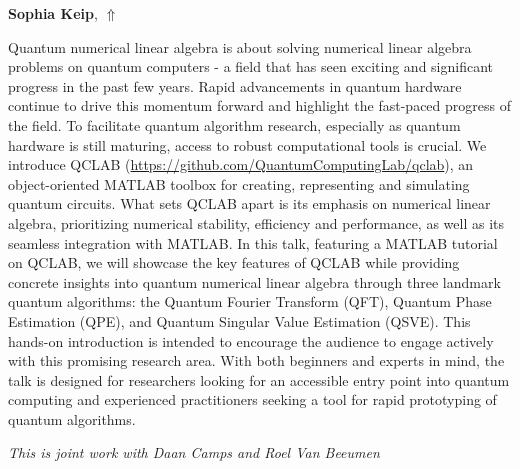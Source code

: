 \documentclass[ILAS2025-program.tex]{subfiles}
\begin{document}
\hypertarget{down0088}{}\begin{ilasabstract}
    
\textbf{Sophia Keip},  \hfill \hyperlink{up0088}{$\Uparrow$}
    
    
\mtskip
    Quantum numerical linear algebra is about solving numerical linear algebra problems on quantum computers - a field that has seen exciting and significant progress in the past few years. Rapid advancements in quantum hardware continue to drive this momentum forward and highlight the fast-paced progress of the field. To facilitate quantum algorithm research, especially as quantum hardware is still maturing, access to robust computational tools is crucial. We introduce QCLAB (\url{https://github.com/QuantumComputingLab/qclab}), an object-oriented MATLAB toolbox for creating, representing and simulating quantum circuits. What sets QCLAB apart is its emphasis on numerical linear algebra, prioritizing numerical stability, efficiency and performance, as well as its seamless integration with MATLAB.
In this talk, featuring a MATLAB tutorial on QCLAB, we will showcase the key features of QCLAB while providing concrete insights into quantum numerical linear algebra through three landmark quantum algorithms: the Quantum Fourier Transform (QFT), Quantum Phase Estimation (QPE), and Quantum Singular Value Estimation (QSVE). This hands-on introduction is intended to encourage the audience to engage actively with this promising research area. With both beginners and experts in mind, the talk is designed for researchers looking for an accessible entry point into quantum computing and experienced practitioners seeking a tool for rapid prototyping of quantum algorithms.



\emph{This is joint work with Daan Camps and Roel Van Beeumen}

\end{ilasabstract}
    
\end{document}
